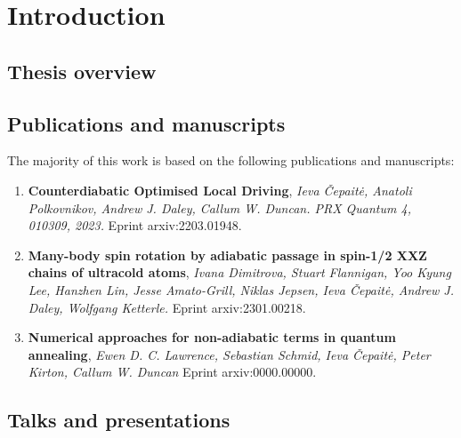 \chapter{Introduction}


\section{Thesis overview}

\section{Publications and manuscripts}

The majority of this work is based on the following publications and manuscripts:

\begin{enumerate}
    \item \textbf{Counterdiabatic Optimised Local Driving}, \textit{Ieva Čepaitė, Anatoli Polkovnikov, Andrew J. Daley, Callum W. Duncan. PRX Quantum 4, 010309, 2023.} Eprint arxiv:2203.01948. \cite{cepaite_counterdiabatic_2023}
    \item \textbf{Many-body spin rotation by adiabatic passage in
    spin-1/2 XXZ chains of ultracold atoms}, \textit{Ivana Dimitrova, Stuart Flannigan, Yoo Kyung Lee, Hanzhen Lin,  Jesse Amato-Grill, Niklas Jepsen, Ieva Čepaitė, Andrew J. Daley, Wolfgang Ketterle.} Eprint arxiv:2301.00218.\cite{dimitrova_many-body_2022}
    \item \textbf{Numerical approaches for non-adiabatic terms in quantum annealing}, \textit{Ewen D. C. Lawrence, Sebastian Schmid, Ieva Čepaitė, Peter Kirton, Callum W. Duncan} Eprint arxiv:0000.00000.
    
    
\end{enumerate}

\section{Talks and presentations}

